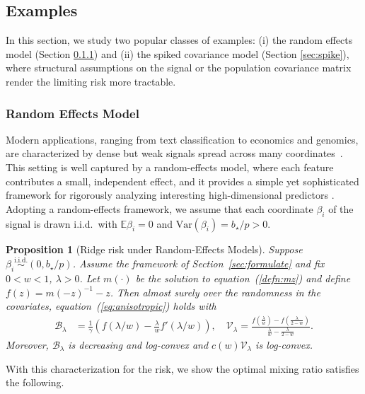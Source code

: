 \documentclass[10pt]{article}
\def\eqref#1{equation~(\ref{#1})}
\newcommand{\mv}{\mathcal{V}}
\newtheorem{prop}{Proposition}
\numberwithin{thm}{section}
\numberwithin{remark}{section}
\numberwithin{ex}{section}
\numberwithin{ass}{section}
\numberwithin{defn}{section}
\numberwithin{lemma}{section}
\numberwithin{corollary}{section}
\numberwithin{prop}{section}
\newcommand{\mb}{\mathcal{B}}
\numberwithin{equation}{section}
\begin{document}
\subsection{Examples}
In this section, we study two popular classes of examples: (i) the random effects model (Section \ref{subsec:randomeffects}) and (ii) the spiked covariance model (Section \ref{sec:spike}), where structural assumptions on the signal or the population covariance matrix render the limiting risk more tractable.

\subsubsection{Random Effects Model}\label{subsec:randomeffects}
Modern applications, ranging from text classification to economics and genomics, are characterized by dense but weak signals spread across many coordinates~\citep{joachims1998text,boyle2017expanded,yang2010common,shen2025can}. This setting is well captured by a random-effects model, where each feature contributes a small, independent effect, and it provides a simple yet sophisticated framework for rigorously analyzing interesting high-dimensional predictors \citep{dobriban2018high}. Adopting a random-effects framework, we assume that each coordinate \(\beta_i\) of the signal is  drawn i.i.d.~with \(\mathbb{E}\beta_i = 0\) and \(\mathrm{Var}(\beta_i)=b_\star/ p >0\).

\begin{prop}[Ridge risk under Random-Effects Models]
  \label{thm:anisotropic_structured}
  Suppose $\beta_i  \stackrel{\text{i.i.d.}}{\sim} (0, b_{\star}/p)$.
  Assume the framework of Section~\ref{sec:formulate} and fix $0<w<1$, $\lambda > 0$. Let $m(\cdot)$ be the solution to \eqref{defn:mz} and define $f(z)=m(-z)^{-1} -z$.
  Then almost surely over the randomness in the covariates,  \eqref{eq:anisotropic} holds with
  \begin{align}\label{eq:rf_answer}
    \mathcal{B}_\lambda & = \frac{1}{\gamma} \left(f(\lambda/w) - \frac{\lambda}{w} f'(\lambda/w)\right), \quad
    \mathcal{V_\lambda} =
    \frac{f\left(\frac{\lambda}{w}\right) - f\left(\frac\lambda{2-w}\right)}{\frac{\lambda}{w} - \frac\lambda{2-w}}.
  \end{align}
  Moreover, $\mb_\lambda$ is decreasing and log-convex and $c(w)\mv_\lambda$ is log-convex.
\end{prop}

With this characterization for the risk, we show the optimal mixing ratio satisfies the following.
\end{document}
